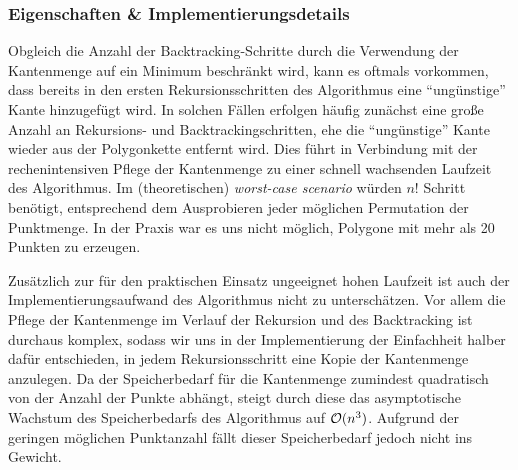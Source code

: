 \subsubsection{Eigenschaften \& Implementierungsdetails}
Obgleich die Anzahl der Backtracking-Schritte durch die Verwendung der Kantenmenge auf ein Minimum beschränkt wird, kann es oftmals vorkommen, dass bereits in den ersten Rekursionsschritten des Algorithmus eine \enquote{ungünstige} Kante hinzugefügt wird. In solchen Fällen erfolgen häufig zunächst eine große Anzahl an Rekursions- und Backtrackingschritten, ehe die \enquote{ungünstige} Kante wieder aus der Polygonkette entfernt wird. Dies führt in Verbindung mit der rechenintensiven Pflege der Kantenmenge zu einer schnell wachsenden Laufzeit des Algorithmus. Im (theoretischen) \emph{worst-case scenario} würden $n!$ Schritt benötigt, entsprechend dem Ausprobieren jeder möglichen Permutation der Punktmenge. In der Praxis war es uns nicht möglich, Polygone mit mehr als 20 Punkten zu erzeugen.

Zusätzlich zur für den praktischen Einsatz ungeeignet hohen Laufzeit ist auch der Implementierungsaufwand des Algorithmus nicht zu unterschätzen. Vor allem die Pflege der Kantenmenge im Verlauf der Rekursion und des Backtracking ist durchaus komplex, sodass wir uns in der Implementierung der Einfachheit halber dafür entschieden, in jedem Rekursionsschritt eine Kopie der Kantenmenge anzulegen. Da der Speicherbedarf für die Kantenmenge zumindest quadratisch von der Anzahl der Punkte abhängt, steigt durch diese das asymptotische Wachstum des Speicherbedarfs des Algorithmus auf $\mathcal{O}(n^3)$. Aufgrund der geringen möglichen Punktanzahl fällt dieser Speicherbedarf jedoch nicht ins Gewicht.